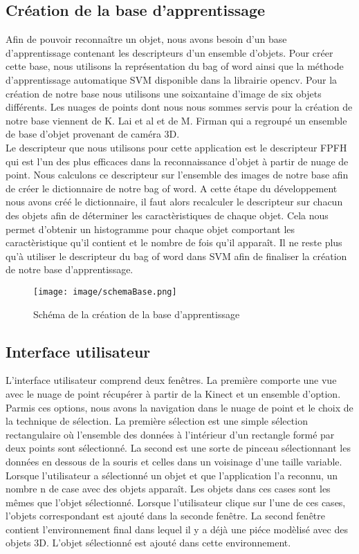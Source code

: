 \subsection{Création de la base d'apprentissage}
Afin de pouvoir reconnaître un objet, nous avons besoin d'un base d'apprentissage contenant les descripteurs d'un ensemble
d'objets. Pour créer cette base, nous utilisons la représentation du \og bag of word \fg ainsi que la méthode d'apprentissage 
automatique SVM\cite{SVM} disponible dans la librairie opencv. Pour la création de notre base nous utilisons une soixantaine
d'image de six objets différents. Les nuages de points dont nous nous sommes servis pour la création de notre base viennent de 
K. Lai et al\cite{Base1} et de M. Firman\cite{generalBase} qui a regroupé un ensemble de base d'objet provenant de caméra 3D.\\

Le descripteur que nous utilisons pour cette application est le descripteur FPFH\cite{FPFH} qui est l'un des plus efficaces dans la
reconnaissance d'objet à partir de nuage de point. Nous calculons ce descripteur sur l'ensemble des images de notre base afin de
créer le dictionnaire de notre bag of word. A cette étape du développement nous avons créé le dictionnaire, il faut alors recalculer
le descripteur sur chacun des objets afin de déterminer les caractèristiques de chaque objet. Cela nous permet d'obtenir un histogramme
pour chaque objet comportant les caractèristique qu'il contient et le nombre de fois qu'il apparaît. Il ne reste plus qu'à utiliser
le descripteur du bag of word dans SVM afin de finaliser la création de notre base d'apprentissage.

\begin{figure}[!ht]
  \begin{center}
    \texttt{[image: image/schemaBase.png]}
    \caption{Schéma de la création de la base d'apprentissage}
  \end{center}
\end{figure}

\subsection{Interface utilisateur}
L'interface utilisateur comprend deux fenêtres. La première comporte une vue avec le nuage de point récupérer à partir de la Kinect
et un ensemble d'option. Parmis ces options, nous avons la navigation dans le nuage de point et le choix de la technique de 
sélection. La première sélection est une simple sélection rectangulaire où l'ensemble des données à l'intérieur d'un rectangle formé
par deux points sont sélectionné. La second est une sorte de pinceau sélectionnant les données en dessous de la souris et celles dans 
un voisinage d'une taille variable. Lorsque l'utilisateur a sélectionné un objet et que l'application l'a reconnu, un nombre n de case 
avec des objets apparaît. Les objets dans ces cases sont les mêmes que l'objet sélectionné. Lorsque l'utilisateur clique sur l'une 
de ces cases, l'objets correspondant est ajouté dans la seconde fenêtre.
La second fenêtre contient l'environnement final dans lequel il y a déjà une piéce modèlisé avec des objets 3D. L'objet sélectionné est 
ajouté dans cette environnement.

